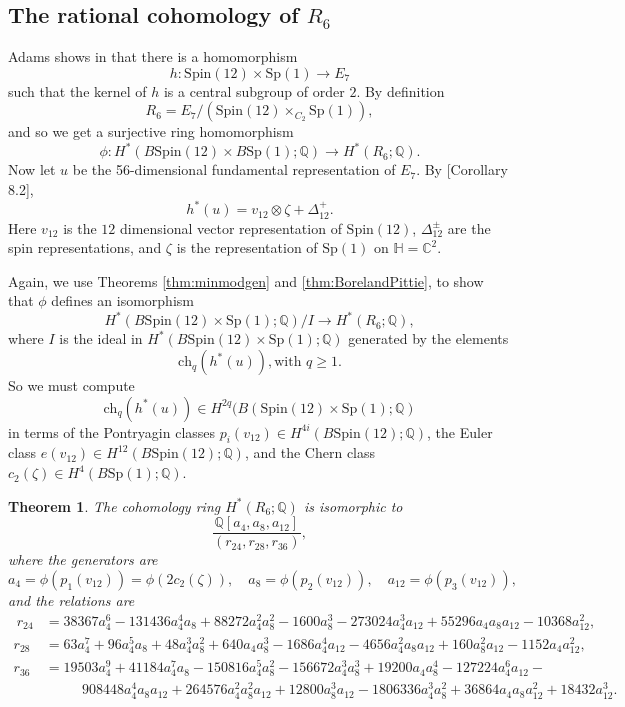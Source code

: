 \documentclass[twoside,a4paper,reqno,11pt]{amsart}
\newtheorem{theorem}[lemma]{Theorem}
\newcommand{\C}{\mathbb{C}}
\renewcommand{\H}{\mathbb{H}}
\newcommand{\Q}{\mathbb{Q}}
\renewcommand{\o}{\otimes}
\newcommand{\Spin}{\mathrm{Spin}}
\newcommand{\Sp}{\mathrm{Sp}}
\newcommand{\ch}{\mathrm{ch}}
\begin{document}
\subsection{The rational cohomology of $R_6$}


Adams shows in \cite[Chapter~8, p.50]{MR1428422} that there is a homomorphism
$$
h : \Spin(12) \times \Sp(1) \to E_7
$$
such that the kernel of $h$ is a central subgroup of order $2$. By definition 
$$
R_6 = E_7/(\Spin(12) \times_{C_2} \Sp(1)),
$$
and so we get a surjective ring homomorphism
$$
\phi  : H^*(B\Spin(12) \times B\Sp(1); \Q) \to H^*(R_6; \Q).
$$
Now let $u$ be the 56-dimensional fundamental representation of $E_7$. By [Corollary 8.2]\cite{MR1428422}, 
\[
h^*(u) = v_{12} \o \zeta + \Delta_{12}^+.
\]
Here $v_{12}$ is the $12$ dimensional vector representation of $\Spin(12)$, $\Delta^{\pm}_{12}$ are the spin representations, and $\zeta$ is the representation of $\Sp(1)$ on $\H = \C^2$.  

Again, we use Theorems \ref{thm:minmodgen} and \ref{thm:BorelandPittie}, to show that $\phi$ defines an isomorphism
$$
H^*(B\Spin(12)\times \Sp(1); \Q)/ I  \to H^*(R_6; \Q),
$$
where $I$ is the ideal in $H^*(B\Spin(12)\times \Sp(1); \Q)$ generated by the elements
\[
 \ch_q(h^*(u)), \text{with $q \geq 1$.}
\]
So we must compute
$$
\ch_q(h^*(u)) \in H^{2q}(B(\Spin(12) \times \Sp(1); \Q)
$$
in terms of the Pontryagin classes $p_i(v_{12}) \in H^{4i}(B\Spin(12); \Q)$, the Euler class $e(v_{12}) \in H^{12}(B\Spin(12); \Q)$, and the Chern class $c_2(\zeta) \in H^4(B\Sp(1); \Q)$.


\begin{theorem} \label{thm:presR6}
The cohomology ring $H^*(R_6; \Q)$ is isomorphic to \[ \frac{\Q[a_{4}, a_{8}, a_{12}]}{(r_{24},r_{28}, r_{36})}, \] 
where the generators are 
\[
a_4 = \phi(p_1(v_{12})) = \phi(2c_2(\zeta)), \quad a_8 = \phi(p_2(v_{12})), \quad a_{12} = \phi(p_3(v_{12})),
\]  and the relations are 
\begin{align*}
\ r_{24} & = 38367 a_4^6 - 131436 a_4^4 a_8 + 88272a _4^2 a_8^2 - 1600 a_8^3 -
273024 a_4^3 a_{12} + 55296 a_4 a_8 a_{12} - 10368 a_{12}^2, \\
r_{28} & = 63 a_4^7 + 96 a_4^5 a_8 + 48 a_4^3 a_8^2 + 640 a_4 a_8^3 - 1686 a_4^4 a_{12} - 4656 a_4^2 a_8 a_{12} + 160 a_8^2 a_{12} -
 1152 a_4 a_{12}^2, \\
r_{36} & = 19503 a_4^9 + 41184 a_4^7 a_8 - 150816 a_4^5 a_8^2 - 156672 a_4^3 a_8^3 + 19200 a_4 a_8^4 - 127224 a_4^6 a_{12} - {} \\ 
 & \phantom{==} 908448 a_4^4 a_8 a_{12} + 264576 a_4^2 a_8^2 a_{12} + 12800 a_8^3 a_{12} - 1806336 a_4^3 a_8^2 + 36864 a_4 a_8 a_{12}^2 + 18432 a_{12}^3.
\end{align*}
\end{theorem}
\end{document}
